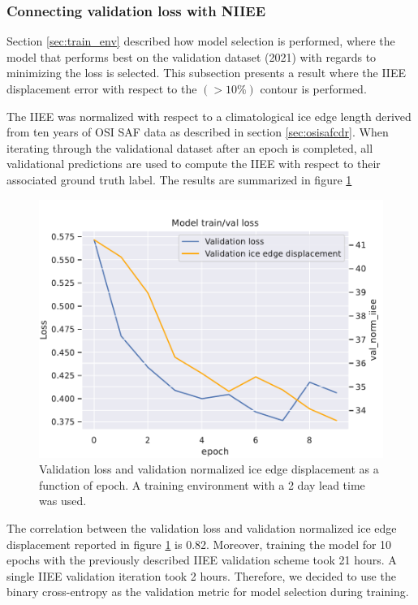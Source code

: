 \documentclass[../main/thesis]{subfiles}
\begin{document}
\subsubsection{Connecting validation loss with NIIEE}
\label{sec:connecting_val_loss_with_NIIEE}
Section \ref{sec:train_env} described how model selection is performed, where the model that performs best on the validation dataset (2021) with regards to minimizing the loss is selected. This subsection presents a result where the IIEE displacement error \citep{Goessling2016, Melsom2019} with respect to the $(>10\%)$ contour is performed. 

The IIEE was normalized with respect to a climatological ice edge length derived from ten years of OSI SAF data as described in section \ref{sec:osisafcdr}. When iterating through the validational dataset after an epoch is completed, all validational predictions are used to compute the IIEE with respect to their associated ground truth label. The results are summarized in figure \ref{fig:val_loss_iiee}

\begin{figure}
    \centering
    \includegraphics[width=\textwidth]{val_loss_iiee}
    \caption{\label{fig:val_loss_iiee}Validation loss and validation normalized ice edge displacement as a function of epoch. A training environment with a 2 day lead time was used.}
\end{figure}

The correlation between the validation loss and validation normalized ice edge displacement reported in figure \ref{fig:val_loss_iiee} is 0.82. Moreover, training the model for 10 epochs with the previously described IIEE validation scheme took 21 hours. A single IIEE validation iteration took 2 hours. Therefore, we decided to use the binary cross-entropy as the validation metric for model selection during training.

\biblio
\end{document}
